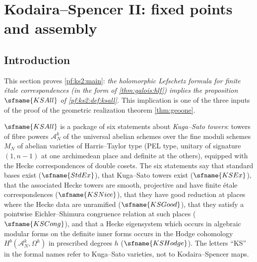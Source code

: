 \section{Kodaira--Spencer II: fixed points and assembly}\label{sec:pf:ks2}

\providecommand{\kstwoG}{G(\A_f^{p})}
\providecommand{\kstwoKS}{\mathcal{A}}
\providecommand{\kstwoOF}{\OO_{F}}
\providecommand{\kstwoLaHat}{\hat\Lambda^{p}}
\providecommand{\kstwoGp}{G_{p}}
\providecommand{\kstwoKp}{K_{p}}
\providecommand{\kstwoBall}{\mathrm{ball}}
\providecommand{\kstwoFib}{\mathrm{fib}}
\providecommand{\kstwoloc}{\mathrm{loc}}

\subsection{Introduction}\label{pf:ks2:intro}

This section proves \cref{pf:ks2:main}: \emph{the holomorphic Lefschetz formula for finite
\'etale correspondences (in the form of \cref{thm:galois:hlf}) implies the proposition
$\sfname{KSAll}$ of \cref{pf:ks2:def:ksall}.} This implication is one of the three inputs of the
proof of the geometric realization theorem \cref{thm:geoone}.

$\sfname{KSAll}$ is a package of six statements about \emph{Kuga--Sato towers}: towers of fibre
powers $\kstwoKS_N^k$ of the universal abelian schemes over the fine moduli schemes $M_N$ of
abelian varieties of Harris--Taylor type (PEL type, unitary of signature $(1,n-1)$ at one
archimedean place and definite at the others), equipped with the Hecke correspondences of double
cosets. The six statements say that standard bases exist ($\sfname{StdEx}$), that Kuga--Sato
towers exist ($\sfname{KSEx}$), that the associated Hecke towers are smooth, projective and have
finite \'etale correspondences ($\sfname{KSNice}$), that they have good reduction at places
where the Hecke data are unramified ($\sfname{KSGood}$), that they satisfy a pointwise
Eichler--Shimura congruence relation at such places ($\sfname{KSCong}$), and that a Hecke
eigensystem which occurs in algebraic modular forms on the definite inner forms occurs in the
Hodge cohomology $H^b(\kstwoKS_N^k,\Omega^{h})$ in prescribed degrees $h$ ($\sfname{KSHodge}$).
The letters ``KS'' in the formal names refer to Kuga--Sato varieties, not to Kodaira--Spencer
maps.

